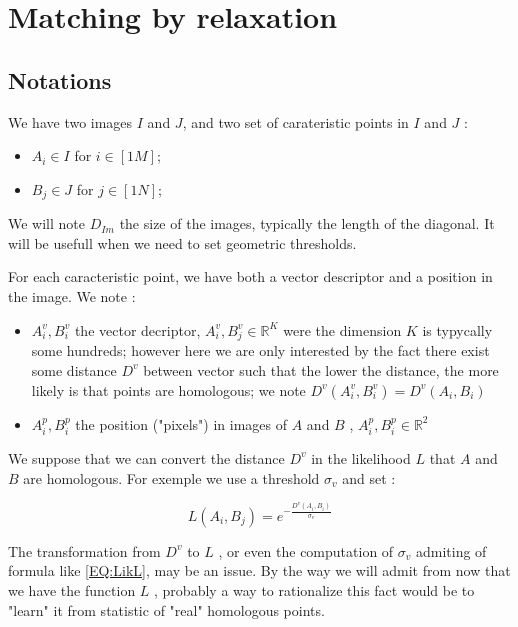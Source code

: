 
\section{Matching by relaxation}

\subsection{Notations}

We have two images $I$ and $J$, and two set of carateristic points
in $I$ and $J$ :

\begin{itemize}
   \item $A_i \in I$ for $i \in [1 M]$;
   \item $B_j \in J$ for $j \in [1 N]$;
\end{itemize}

We will note $D_{Im}$ the size of the images, typically the length of the diagonal. It will be usefull
when we need to set geometric thresholds.

For each caracteristic point, we have both a vector descriptor and a position in the image.
We note :

\begin{itemize}
   \item $A^v_i , B^v_i$  the vector decriptor,  
         $A^v_i, B^v_j \in \mathbb{R}^K $  were the dimension $K$
         is typycally some hundreds; however here we are only interested by the fact  there exist 
         some distance $D^v$ between
         vector such that the lower the distance, the more likely is that points are homologous;
         we note $D^v(A^v_i , B^v_i) = D^v(A_i , B_i) $
   \item  $A^p_i , B^p_i$  the position ("pixels")   in images of $A$ and $B$ , 
         $A^p_i , B^p_i \in \mathbb{R}^2$
\end{itemize}


We suppose that we can convert the distance $D^v$ in the likelihood $L$   that $A$ and $B$
are homologous. For exemple we  use a threshold $\sigma_v$ and set :

\begin{equation}
    L(A_i,B_j) =  e^{-\frac{D^v(A_i,B_i)}{\sigma_v}} \label{EQ:LikL}
\end{equation}

The transformation from  $D^v$ to $L$  , or even the computation of $\sigma_v$
admiting of formula like \ref{EQ:LikL}, may be an issue. By the way we will admit from
now that we have the function $ L$ , probably a way to rationalize this fact
would be to "learn" it from statistic of "real" homologous points.


